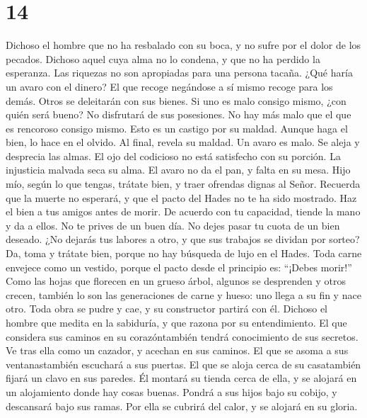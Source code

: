 \hypertarget{section-13}{%
\section{14}\label{section-13}}

 Dichoso el hombre que no ha resbalado con su boca, y no
sufre por el dolor de los pecados.  Dichoso aquel cuya
alma no lo condena, y que no ha perdido la esperanza.  Las
riquezas no son apropiadas para una persona tacaña. ¿Qué haría un avaro
con el dinero?  El que recoge negándose a sí mismo recoge
para los demás. Otros se deleitarán con sus bienes.  Si
uno es malo consigo mismo, ¿con quién será bueno? No disfrutará de sus
posesiones.  No hay más malo que el que es rencoroso
consigo mismo. Esto es un castigo por su maldad.  Aunque
haga el bien, lo hace en el olvido. Al final, revela su maldad.
 Un avaro es malo. Se aleja y desprecia las almas.
 El ojo del codicioso no está satisfecho con su porción.
La injusticia malvada seca su alma.  El avaro no da el
pan, y falta en su mesa.  Hijo mío, según lo que tengas,
trátate bien, y traer ofrendas dignas al Señor.  Recuerda
que la muerte no esperará, y que el pacto del Hades no te ha sido
mostrado.  Haz el bien a tus amigos antes de morir. De
acuerdo con tu capacidad, tiende la mano y da a ellos. 
No te prives de un buen día. No dejes pasar tu cuota de un bien deseado.
 ¿No dejarás tus labores a otro, y que sus trabajos se
dividan por sorteo?  Da, toma y trátate bien, porque no
hay búsqueda de lujo en el Hades.  Toda carne envejece
como un vestido, porque el pacto desde el principio es: ``¡Debes
morir!''  Como las hojas que florecen en un grueso árbol,
algunos se desprenden y otros crecen, también lo son las generaciones de
carne y hueso: uno llega a su fin y nace otro.  Toda obra
se pudre y cae, y su constructor partirá con él.  Dichoso
el hombre que medita en la sabiduría, y que razona por su entendimiento.
 El que considera sus caminos en su corazóntambién tendrá
conocimiento de sus secretos.  Ve tras ella como un
cazador, y acechan en sus caminos.  El que se asoma a sus
ventanastambién escuchará a sus puertas.  El que se aloja
cerca de su casatambién fijará un clavo en sus paredes. 
Él montará su tienda cerca de ella, y se alojará en un alojamiento donde
hay cosas buenas.  Pondrá a sus hijos bajo su cobijo, y
descansará bajo sus ramas.  Por ella se cubrirá del
calor, y se alojará en su gloria.

